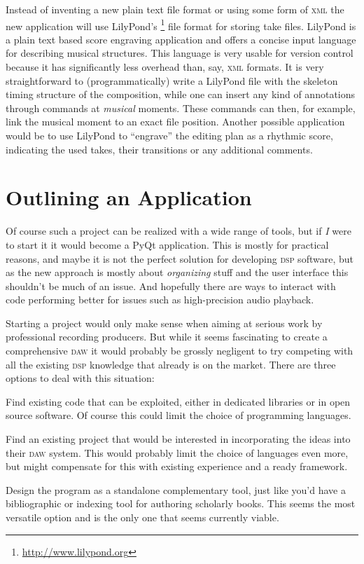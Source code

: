 \documentclass[11pt,a4paper]{article}
\begin{document}
\medskip
Instead of inventing a new plain text file format or using some form of
\textsc{xml} the new application will use LilyPond's%
\footnote{\url{http://www.lilypond.org}}
file format for storing take files.
LilyPond is a plain text based score engraving application and offers a
concise input language for describing musical structures.
This language is very usable for version control because it has
significantly less overhead than, say, \textsc{xml} formats.
It is very straightforward to (programmatically) write a LilyPond file with the
skeleton timing structure of the composition, while one can insert any
kind of annotations through commands at \emph{musical} moments.
These commands can then, for example, link the musical moment to an
exact file position.
Another possible application would be to use LilyPond to “engrave” the
editing plan as a rhythmic score, indicating the used takes, their
transitions or any additional comments.

\section{Outlining an Application}

Of course such a project can be realized with a wide range of tools, but if
\emph{I} were to start it it would become a PyQt application.
This is mostly for practical reasons, and maybe it is not the perfect solution
for developing \textsc{dsp} software, but as the new approach is mostly about
\emph{organizing} stuff and the user interface this shouldn't be much of an issue.
And hopefully there are ways to interact with code performing better for issues
such as high-precision audio playback.

Starting a project would only make sense when aiming at serious work by
professional recording producers.
But while it seems fascinating to create a comprehensive \textsc{daw} 
it would probably be grossly negligent to try competing with all the
existing \textsc{dsp} knowledge that already is on the market.
There are three options to deal with this situation:

\begin{itemize*}
\item Find existing code that can be exploited, either in dedicated libraries or
in open source software.
Of course this could limit the choice of programming languages.
\item Find an existing project that would be interested in incorporating the
ideas into their \textsc{daw} system.
This would probably limit the choice of languages even more, but might
compensate for this with existing experience and a ready framework.
\item Design the program as a standalone complementary tool, just like you'd
have a bibliographic or indexing tool for authoring scholarly books.
This seems the most versatile option and is the only one that seems currently
viable.
\end{itemize*}
\end{document}
